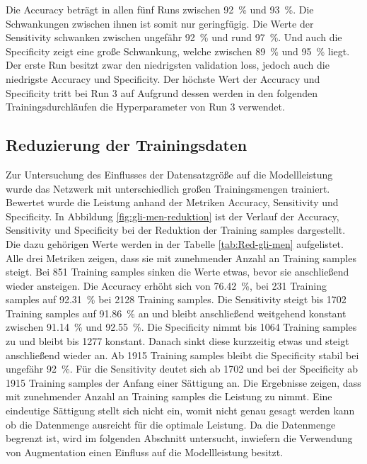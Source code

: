 Die Accuracy beträgt in allen fünf Runs zwischen \SI{92}{\%} und \SI{93}{\%}. Die Schwankungen zwischen ihnen ist somit nur geringfügig.
Die Werte der Sensitivity schwanken zwischen ungefähr \SI{92}{\%} und rund \SI{97}{\%}.
Und auch die Specificity zeigt eine große Schwankung, welche zwischen \SI{89}{\%} und \SI{95}{\%} liegt.
Der erste Run besitzt zwar den niedrigsten validation loss, jedoch auch die niedrigste Accuracy und Specificity.
Der höchste Wert der Accuracy und Specificity tritt bei Run 3 auf
Aufgrund dessen werden in den folgenden Trainingsdurchläufen die Hyperparameter von Run 3 verwendet.

\subsection{Reduzierung der Trainingsdaten}
Zur Untersuchung des Einflusses der Datensatzgröße auf die Modellleistung wurde das Netzwerk mit unterschiedlich großen Trainingsmengen trainiert. 
Bewertet wurde die Leistung anhand der Metriken Accuracy, Sensitivity und Specificity.
In Abbildung \ref{fig:gli-men-reduktion} ist der Verlauf der Accuracy, Sensitivity und Specificity bei der Reduktion der Training samples dargestellt.
Die dazu gehörigen Werte werden in der Tabelle \ref{tab:Red-gli-men} aufgelistet.
Alle drei Metriken zeigen, dass sie mit zunehmender Anzahl an Training samples steigt. 
Bei 851 Training samples sinken die Werte etwas, bevor sie anschließend wieder ansteigen.
Die Accuracy erhöht sich von \SI{76.42}{\percent}, bei 231 Training samples auf \SI{92.31}{\percent} bei 2128 Training samples.
Die Sensitivity steigt bis 1702 Training samples auf \SI{91.86}{\%} an und bleibt anschließend weitgehend konstant zwischen \SI{91.14}{\%} und \SI{92.55}{\%}.
Die Specificity nimmt bis 1064 Training samples zu und bleibt bis 1277 konstant. 
Danach sinkt diese kurzzeitig etwas und steigt anschließend wieder an. 
Ab 1915 Training samples bleibt die Specificity stabil bei ungefähr \SI{92}{\%}.
Für die Sensitivity deutet sich ab 1702 und bei der Specificity ab 1915 Training samples der Anfang einer Sättigung an.
Die Ergebnisse zeigen, dass mit zunehmender Anzahl an Training samples die Leistung zu nimmt.
Eine eindeutige Sättigung stellt sich nicht ein, womit nicht genau gesagt werden kann ob die Datenmenge ausreicht für die optimale Leistung. 
Da die Datenmenge begrenzt ist, wird im folgenden Abschnitt untersucht, inwiefern die Verwendung von Augmentation einen Einfluss auf die Modellleistung besitzt. 
